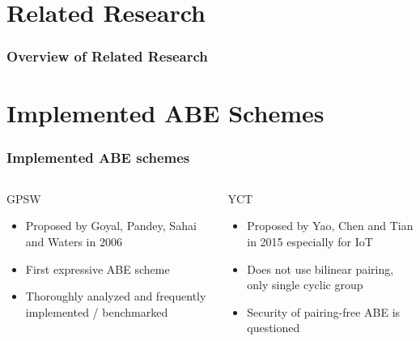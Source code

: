 
\section{Related Research}
\begin{frame}[c]
    \frametitle{Overview of Related Research}
    \begin{center}
        
    \end{center}
\end{frame}

\section{Implemented ABE Schemes}
\begin{frame}
    \frametitle{Implemented ABE schemes}
    \vspace{2.5cm}
    \begin{columns}[t]\centering
        \begin{block}{\centering GPSW}
            \centering
            \begin{itemize}
                \item Proposed by Goyal, Pandey, Sahai and Waters in 2006
                \item First expressive ABE scheme
                \item Thoroughly analyzed and frequently implemented / benchmarked
            \end{itemize}
        \end{block}

        \begin{block}{\centering YCT}
            \centering
            \begin{itemize}
                \item Proposed by Yao, Chen and Tian in 2015 especially for IoT
                \item Does not use bilinear pairing, only single cyclic group
                \item Security of pairing-free ABE is questioned
            \end{itemize}
        \end{block}
        
    \end{columns}
\end{frame}


